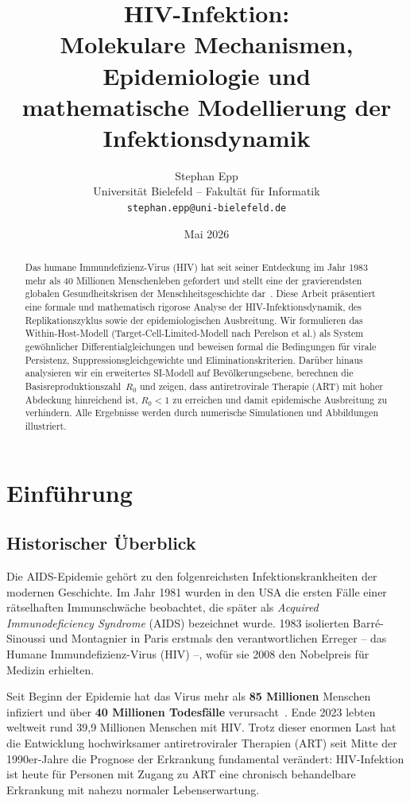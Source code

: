 ﻿\documentclass[a4paper,12pt]{article}
\title{\textbf{HIV-Infektion:}\\[0.4em]
\large Molekulare Mechanismen, Epidemiologie und\\
mathematische Modellierung der Infektionsdynamik}
\author{Stephan Epp\\
\small Universit\"at Bielefeld -- Fakult\"at f\"ur Informatik\\
\small \texttt{stephan.epp@uni-bielefeld.de}}
\date{Mai 2026}
\theoremstyle{definition}
\begin{document}
\maketitle

\begin{abstract}
Das humane Immundefizienz-Virus (HIV) hat seit seiner Entdeckung im Jahr 1983 mehr als 40 Millionen
Menschenleben gefordert und stellt eine der gravierendsten globalen Gesundheitskrisen der
Menschheitsgeschichte dar~\cite{bekker2023hiv}.
Diese Arbeit pr\"asentiert eine formale und mathematisch rigorose Analyse der HIV-Infektionsdynamik,
des Replikationszyklus sowie der epidemiologischen Ausbreitung.
Wir formulieren das Within-Host-Modell (Target-Cell-Limited-Modell nach Perelson et al.)
als System gew\"ohnlicher Differentialgleichungen und beweisen formal die Bedingungen
f\"ur virale Persistenz, Suppressionsgleichgewichte und Eliminationskriterien.
Dar\"uber hinaus analysieren wir ein erweitertes SI-Modell auf Bev\"olkerungsebene,
berechnen die Basisreproduktionszahl~$R_0$ und zeigen, dass antiretrovirale Therapie (ART)
mit hoher Abdeckung hinreichend ist, $R_0 < 1$ zu erreichen und damit epidemische Ausbreitung
zu verhindern. Alle Ergebnisse werden durch numerische Simulationen und Abbildungen illustriert.
\end{abstract}

\tableofcontents
\newpage

\section{Einf\"uhrung}

\subsection{Historischer \"Uberblick}

Die AIDS-Epidemie geh\"ort zu den folgenreichsten Infektionskrankheiten der modernen Geschichte.
Im Jahr 1981 wurden in den USA die ersten F\"alle einer r\"atselhaften Immunschw\"ache
beobachtet, die sp\"ater als \emph{Acquired Immunodeficiency Syndrome} (AIDS) bezeichnet wurde.
1983 isolierten Barr\'e-Sinoussi und Montagnier in Paris erstmals den verantwortlichen Erreger
-- das Humane Immundefizienz-Virus (HIV) --, wof\"ur sie 2008 den Nobelpreis f\"ur Medizin erhielten.

Seit Beginn der Epidemie hat das Virus mehr als \textbf{85 Millionen} Menschen infiziert und
\"uber \textbf{40 Millionen Todesfälle} verursacht~\cite{bekker2023hiv}. Ende 2023 lebten
weltweit rund 39,9 Millionen Menschen mit HIV. Trotz dieser enormen Last hat die Entwicklung
hochwirksamer antiretroviraler Therapien (ART) seit Mitte der 1990er-Jahre die Prognose der
Erkrankung fundamental ver\"andert: HIV-Infektion ist heute f\"ur Personen mit Zugang zu ART
eine chronisch behandelbare Erkrankung mit nahezu normaler Lebenserwartung.
\end{document}
